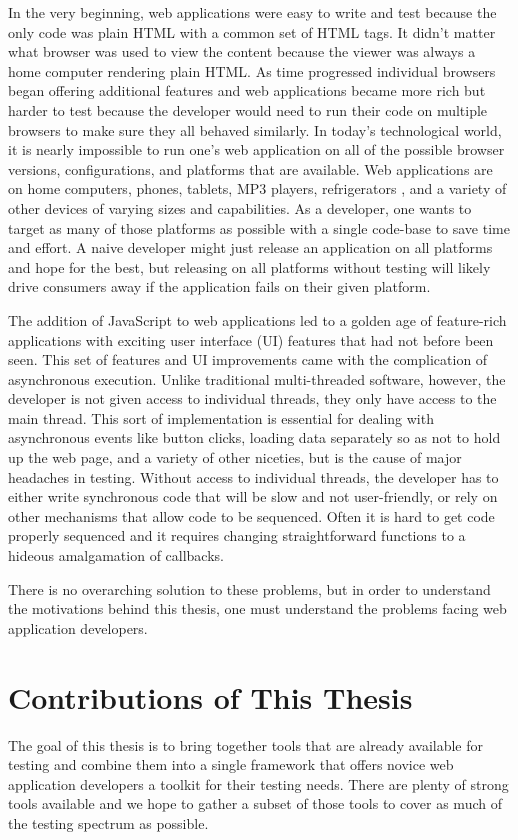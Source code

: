 \documentclass[12pt]{ucthesis}
\begin{document}
In the very beginning, web applications were easy to write and test because the only code was plain HTML with a common set of HTML tags. It didn't matter what browser was used to view the content because the viewer was always a home computer rendering plain HTML. As time progressed individual browsers began offering additional features and web applications became more rich but harder to test because the developer would need to run their code on multiple browsers to make sure they all behaved similarly. In today's technological world, it is nearly impossible to run one's web application on all of the possible browser versions, configurations, and platforms that are available. Web applications are on home computers, phones, tablets, MP3 players, refrigerators \cite{SamsungFridge}, and a variety of other devices of varying sizes and capabilities. As a developer, one wants to target as many of those platforms as possible with a single code-base to save time and effort. A naive developer might just release an application on all platforms and hope for the best, but releasing on all platforms without testing will likely drive consumers away if the application fails on their given platform.

The addition of JavaScript to web applications led to a golden age of feature-rich applications with exciting user interface (UI) features that had not before been seen. This set of features and UI improvements came with the complication of asynchronous execution. Unlike traditional multi-threaded software, however, the developer is not given access to individual threads, they only have access to the main thread. This sort of implementation is essential for dealing with asynchronous events like button clicks, loading data separately so as not to hold up the web page, and a variety of other niceties, but is the cause of major headaches in testing. Without access to individual threads, the developer has to either write synchronous code that will be slow and not user-friendly, or rely on other mechanisms that allow code to be sequenced. Often it is hard to get code properly sequenced and it requires changing straightforward functions to a hideous amalgamation of callbacks.

There is no overarching solution to these problems, but in order to understand the motivations behind this thesis, one must understand the problems facing web application developers.

\section{Contributions of This Thesis}
The goal of this thesis is to bring together tools that are already available for testing and combine them into a single framework that offers novice web application developers a toolkit for their testing needs. There are plenty of strong tools available and we hope to gather a subset of those tools to cover as much of the testing spectrum as possible. 
\end{document}
